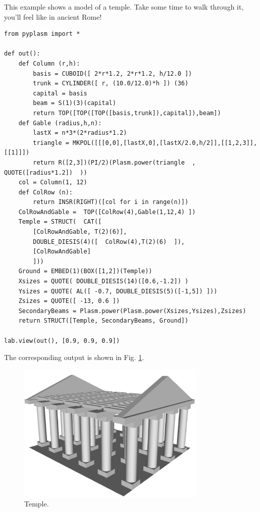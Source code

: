 \documentclass[article,A4,12pt]{llncs}
\begin{document}
This example shows a model of a temple. Take some 
time to walk through it, you'll feel like in ancient Rome!
{\small
\begin{verbatim}
from pyplasm import *

def out():
    def Column (r,h):
        basis = CUBOID([ 2*r*1.2, 2*r*1.2, h/12.0 ]) 
        trunk = CYLINDER([ r, (10.0/12.0)*h ]) (36)
        capital = basis
        beam = S(1)(3)(capital) 
        return TOP([TOP([TOP([basis,trunk]),capital]),beam])
    def Gable (radius,h,n): 
        lastX = n*3*(2*radius*1.2)
        triangle = MKPOL([[[0,0],[lastX,0],[lastX/2.0,h/2]],[[1,2,3]],[[1]]])
        return R([2,3])(PI/2)(Plasm.power(triangle  , QUOTE([radius*1.2])  ))
    col = Column(1, 12)
    def ColRow (n): 
        return INSR(RIGHT)([col for i in range(n)])
    ColRowAndGable =  TOP([ColRow(4),Gable(1,12,4) ])
    Temple = STRUCT(  CAT([
        [ColRowAndGable, T(2)(6)], 
        DOUBLE_DIESIS(4)([  ColRow(4),T(2)(6)  ]), 
        [ColRowAndGable] 
        ]))
    Ground = EMBED(1)(BOX([1,2])(Temple))
    Xsizes = QUOTE( DOUBLE_DIESIS(14)([0.6,-1.2]) )
    Ysizes = QUOTE( AL([ -0.7, DOUBLE_DIESIS(5)([-1,5]) ]))
    Zsizes = QUOTE([ -13, 0.6 ])
    SecondaryBeams = Plasm.power(Plasm.power(Xsizes,Ysizes),Zsizes)
    return STRUCT([Temple, SecondaryBeams, Ground])

lab.view(out(), [0.9, 0.9, 0.9])
\end{verbatim}
}
\noindent
The corresponding output is shown in Fig. \ref{fig:temple}.


\begin{figure}[!ht]
\begin{center}
\includegraphics[width=0.8\textwidth]{img/temple.png}
\end{center}
\vspace{-2mm}
\caption{Temple.}
\label{fig:temple}
\end{figure}
\noindent
\end{document}
